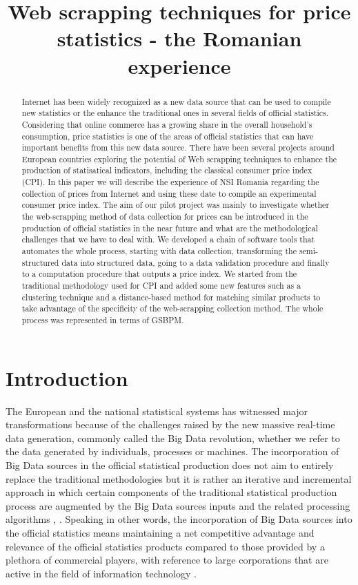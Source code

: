 \documentclass[]{article}
\title{Web scrapping techniques for price statistics -  the Romanian experience}
\author{}
\begin{document}
\maketitle

\begin{abstract}
Internet has been widely recognized as a new data source that can be used to compile new statistics or the enhance the 
traditional ones in several fields of official statistics. Considering that online commerce has a growing share in the 
overall household’s consumption, price statistics is one of the areas of official statistics that can have important 
benefits from this new data source. There have been several projects around European countries exploring the potential 
of Web scrapping techniques to enhance the production of statisatical indicators, including the classical consumer price index (CPI). 
In this paper we will describe the experience of NSI Romania regarding the collection of prices from Internet and 
using these date to compile an experimental consumer price index. The aim of our pilot project was mainly to investigate whether 
the web-scrapping method of data collection for prices can be introduced in the production of official statistics in the near future 
and what are the methodological challenges that we have to deal with.  
We developed a chain of software tools that automates the whole process, starting with data collection, transforming the semi-structured 
data into structured data, going to a data validation procedure and finally to a computation procedure that outputs a price index. 
We started from the traditional methodology used for CPI and added some new features such as a clustering technique and a 
distance-based method for matching similar products to take advantage of the specificity of the web-scrapping collection method. 
The whole process was represented in terms of GSBPM.
\end{abstract}

\section{Introduction}

The European and the national statistical systems has witnessed major transformations because of the challenges raised by the new 
massive real-time data generation, commonly called the Big Data revolution, whether we refer to the data generated by individuals, 
processes or machines. The incorporation of Big Data sources in the official statistical production does not aim to entirely replace the 
traditional methodologies but it is rather an iterative and incremental approach in which certain components of the traditional 
statistical production process are augmented by the Big Data sources inputs and the related processing algorithms \cite{grif2016_1}, \cite{grif2016_2}. 
Speaking in other words, the incorporation of Big Data sources into the official statistics means maintaining a net competitive advantage and 
relevance of the official statistics products compared to those provided by a plethora of commercial players, with reference to 
large corporations that are active in the field of information technology \cite{eu2012}.
\end{document}
